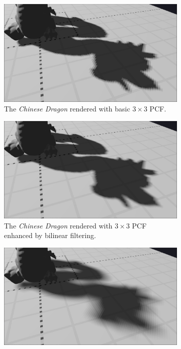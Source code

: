 \begin{figure}[h]
    \centering
    \begin{subfigure}[t]{0.45\textwidth}
		\centering
        \includegraphics[width=\textwidth]{./graf/tests/pcf/cropped/dragon_pcf_fhd_512_3x3.png}
        \caption{The \textit{Chinese Dragon} rendered with basic \(3\times 3\) PCF.}
    \end{subfigure}
	\hfill
    \begin{subfigure}[t]{0.45\textwidth}
		\centering
        \includegraphics[width=\textwidth]{./graf/tests/pcf/cropped/dragon_pcf_fhd_512_3x3_bilinear.png}
        \caption{The \textit{Chinese Dragon} rendered with \(3\times 3\) PCF enhanced by bilinear filtering.}
    \end{subfigure}
    \begin{subfigure}[t]{0.45\textwidth}
		\centering
        \includegraphics[width=\textwidth]{./graf/tests/pcf/cropped/dragon_pcf_fhd_512_11x11.png}

\end{subfigure}
\end{figure}
